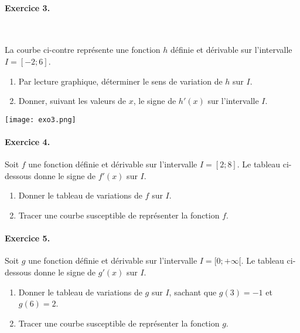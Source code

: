 \documentclass[11pt]{article}
\begin{document}
\paragraph{Exercice 3.}~\\[2mm]
\begin{minipage}{.6\textwidth}
  La courbe ci-contre représente une fonction $h$ définie et dérivable sur
  l'intervalle $I=[-2;6]$.
  \begin{enumerate}
    \item Par lecture graphique, déterminer le sens de variation de $h$ sur $I$.
    \item Donner, suivant les valeurs de $x$, le signe de $h'(x)$ sur
      l'intervalle $I$.
  \end{enumerate}
\end{minipage}
\begin{minipage}{.4\textwidth}
  \begin{center}
    \texttt{[image: exo3.png]}
  \end{center}
\end{minipage}

\paragraph{Exercice 4.} Soit $f$ une fonction définie et dérivable sur
l'intervalle $I=[2;8]$. Le tableau ci-dessous donne le signe de $f'(x)$ sur $I$.
\begin{center}
\end{center}
\begin{enumerate}
  \item Donner le tableau de variations de $f$ sur $I$.
  \item Tracer une courbe susceptible de représenter la fonction $f$.
\end{enumerate}

\paragraph{Exercice 5.} Soit $g$ une fonction définie et dérivable sur
l'intervalle $I=[0;+\infty[$. Le tableau ci-dessous donne le signe de $g'(x)$ sur $I$.
\begin{center}
\end{center}
\begin{enumerate}
  \item Donner le tableau de variations de $g$ sur $I$, sachant que $g(3)=-1$ et
    $g(6)=2$.
  \item Tracer une courbe susceptible de représenter la fonction $g$.
\end{enumerate}
\end{document}
